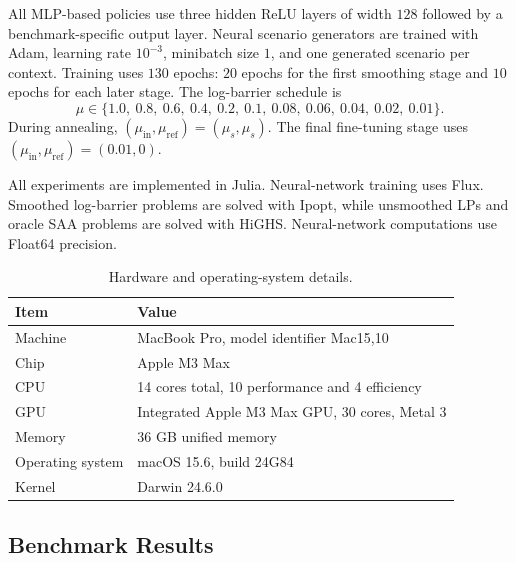 \documentclass{article}
\newcommand{\1}{\mathbf{1}}
\theoremstyle{plain}
\theoremstyle{definition}
\theoremstyle{remark}
\begin{document}
All MLP-based policies use three hidden ReLU layers of width $128$ followed by a benchmark-specific output layer. Neural scenario generators are trained with Adam, learning rate $10^{-3}$, minibatch size $1$, and one generated scenario per context. Training uses $130$ epochs: $20$ epochs for the first smoothing stage and $10$ epochs for each later stage. The log-barrier schedule is
\[
\mu\in
\{1.0,\ 0.8,\ 0.6,\ 0.4,\ 0.2,\ 0.1,\ 0.08,\ 0.06,\ 0.04,\ 0.02,\ 0.01\}.
\]
During annealing, $(\mu_{\mathrm{in}},\mu_{\mathrm{ref}})=(\mu_s,\mu_s)$. The final fine-tuning stage uses $(\mu_{\mathrm{in}},\mu_{\mathrm{ref}})=(0.01,0)$.

All experiments are implemented in Julia. Neural-network training uses Flux. Smoothed log-barrier problems are solved with Ipopt, while unsmoothed LPs and oracle SAA problems are solved with HiGHS. Neural-network computations use Float64 precision.

\begin{table}[h]
\centering
\small
\begin{tabular}{ll}
\toprule
Item & Value \\
\midrule
Machine & MacBook Pro, model identifier Mac15,10 \\
Chip & Apple M3 Max \\
CPU & 14 cores total, 10 performance and 4 efficiency \\
GPU & Integrated Apple M3 Max GPU, 30 cores, Metal 3 \\
Memory & 36 GB unified memory \\
Operating system & macOS 15.6, build 24G84 \\
Kernel & Darwin 24.6.0 \\
\bottomrule
\end{tabular}
\caption{Hardware and operating-system details.}
\label{tab:app-hardware}
\end{table}

\clearpage
\subsection{Benchmark Results}

\begin{table}[H]
\centering
\scriptsize
\setlength{\tabcolsep}{2.5pt}
\caption{Benchmark comparison.}
\label{tab:app-dfl-overlap-comparison}
\end{table}
\end{document}
